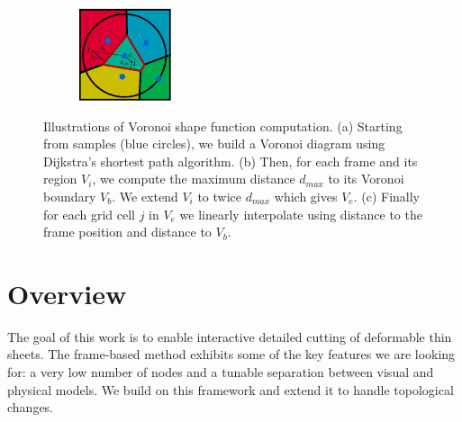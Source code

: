 \documentclass[11pt, oneside, a4paper]{memoir}
\begin{document}
\begin{figure}[!ht]
\begin{subfigure}[b]{0.20\linewidth}
\caption{\label{fig:buildSF2}}
\end{subfigure}
\hspace{2cm}
\begin{subfigure}[b]{0.20\linewidth}
\centering
\includegraphics[width=\linewidth]{images/cutting-mig2015/buildSF_3.pdf}
\caption{\label{fig:buildSF3}}
\end{subfigure}
\caption{\label{fig:shapefunctionconstruction}
Illustrations of Voronoi shape function computation. (a) Starting from samples (blue circles), we build a Voronoi diagram using Dijkstra's shortest path algorithm. (b) Then, for each frame and its region $V_{i}$, we compute the maximum distance $d_{max}$ to its Voronoi boundary $V_{b}$. We extend $V_{i}$ to twice $d_{max}$ which gives $V_{e}$. (c) Finally for each grid cell $j$ in $V_{e}$ we linearly interpolate using distance to the frame position and distance to $V_{b}$.}
\end{figure}

\section{Overview}

The goal of this work is to enable interactive detailed cutting of deformable thin sheets. The frame-based method exhibits some of the key features we are looking for: a very low number of nodes and a tunable separation between visual and physical models.  We build on this framework and extend it to handle topological changes.
\end{document}
